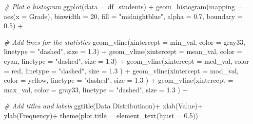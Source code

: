 \documentclass[
]{article}
\newenvironment{Shaded}{\begin{snugshade}}{\end{snugshade}}
\newcommand{\AttributeTok}[1]{\textcolor[rgb]{0.77,0.63,0.00}{#1}}
\newcommand{\CommentTok}[1]{\textcolor[rgb]{0.56,0.35,0.01}{\textit{#1}}}
\newcommand{\DecValTok}[1]{\textcolor[rgb]{0.00,0.00,0.81}{#1}}
\newcommand{\FloatTok}[1]{\textcolor[rgb]{0.00,0.00,0.81}{#1}}
\newcommand{\FunctionTok}[1]{\textcolor[rgb]{0.00,0.00,0.00}{#1}}
\newcommand{\NormalTok}[1]{#1}
\newcommand{\SpecialCharTok}[1]{\textcolor[rgb]{0.00,0.00,0.00}{#1}}
\newcommand{\StringTok}[1]{\textcolor[rgb]{0.31,0.60,0.02}{#1}}
\begin{document}
\begin{Shaded}
\begin{Highlighting}[]
\CommentTok{\# Plot a histogram}
\FunctionTok{ggplot}\NormalTok{(}\AttributeTok{data =}\NormalTok{ df\_students) }\SpecialCharTok{+}
  \FunctionTok{geom\_histogram}\NormalTok{(}\AttributeTok{mapping =} \FunctionTok{aes}\NormalTok{(}\AttributeTok{x =}\NormalTok{ Grade), }\AttributeTok{binwidth =} \DecValTok{20}\NormalTok{, }\AttributeTok{fill =} \StringTok{"midnightblue"}\NormalTok{, }\AttributeTok{alpha =} \FloatTok{0.7}\NormalTok{, }\AttributeTok{boundary =} \FloatTok{0.5}\NormalTok{) }\SpecialCharTok{+}
  
\CommentTok{\# Add lines for the statistics}
  \FunctionTok{geom\_vline}\NormalTok{(}\AttributeTok{xintercept =}\NormalTok{ min\_val, }\AttributeTok{color =} \StringTok{\textquotesingle{}gray33\textquotesingle{}}\NormalTok{, }\AttributeTok{linetype =} \StringTok{"dashed"}\NormalTok{, }\AttributeTok{size =} \FloatTok{1.3}\NormalTok{) }\SpecialCharTok{+}
  \FunctionTok{geom\_vline}\NormalTok{(}\AttributeTok{xintercept =}\NormalTok{ mean\_val, }\AttributeTok{color =} \StringTok{\textquotesingle{}cyan\textquotesingle{}}\NormalTok{, }\AttributeTok{linetype =} \StringTok{"dashed"}\NormalTok{, }\AttributeTok{size =} \FloatTok{1.3}\NormalTok{) }\SpecialCharTok{+}
  \FunctionTok{geom\_vline}\NormalTok{(}\AttributeTok{xintercept =}\NormalTok{ med\_val, }\AttributeTok{color =} \StringTok{\textquotesingle{}red\textquotesingle{}}\NormalTok{, }\AttributeTok{linetype =} \StringTok{"dashed"}\NormalTok{, }\AttributeTok{size =} \FloatTok{1.3}\NormalTok{ ) }\SpecialCharTok{+}
  \FunctionTok{geom\_vline}\NormalTok{(}\AttributeTok{xintercept =}\NormalTok{ mod\_val, }\AttributeTok{color =} \StringTok{\textquotesingle{}yellow\textquotesingle{}}\NormalTok{, }\AttributeTok{linetype =} \StringTok{"dashed"}\NormalTok{, }\AttributeTok{size =} \FloatTok{1.3}\NormalTok{ ) }\SpecialCharTok{+}
  \FunctionTok{geom\_vline}\NormalTok{(}\AttributeTok{xintercept =}\NormalTok{ max\_val, }\AttributeTok{color =} \StringTok{\textquotesingle{}gray33\textquotesingle{}}\NormalTok{, }\AttributeTok{linetype =} \StringTok{"dashed"}\NormalTok{, }\AttributeTok{size =} \FloatTok{1.3}\NormalTok{ ) }\SpecialCharTok{+}
  
\CommentTok{\# Add titles and labels}
  \FunctionTok{ggtitle}\NormalTok{(}\StringTok{\textquotesingle{}Data Distributiaon\textquotesingle{}}\NormalTok{)}\SpecialCharTok{+}
  \FunctionTok{xlab}\NormalTok{(}\StringTok{\textquotesingle{}Value\textquotesingle{}}\NormalTok{)}\SpecialCharTok{+}
  \FunctionTok{ylab}\NormalTok{(}\StringTok{\textquotesingle{}Frequency\textquotesingle{}}\NormalTok{)}\SpecialCharTok{+}
  \FunctionTok{theme}\NormalTok{(}\AttributeTok{plot.title =} \FunctionTok{element\_text}\NormalTok{(}\AttributeTok{hjust =} \FloatTok{0.5}\NormalTok{))}
\end{Highlighting}
\end{Shaded}
\end{document}

